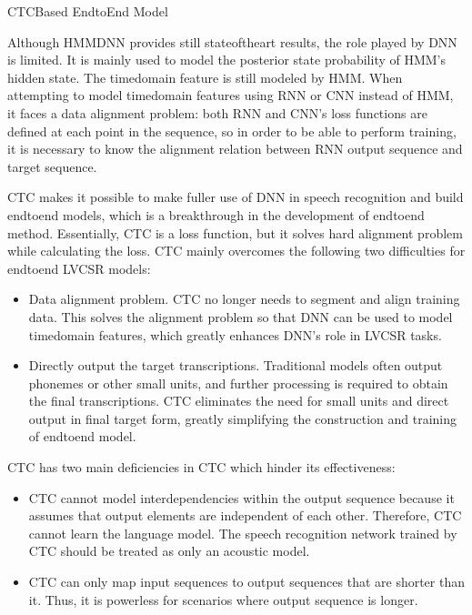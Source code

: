 \documentclass[letterpaper,10pt,english]{jupyterBook}
\begin{document}
\sphinxAtStartPar
CTC\sphinxhyphen{}Based End\sphinxhyphen{}to\sphinxhyphen{}End Model

\sphinxAtStartPar
Although HMM\sphinxhyphen{}DNN provides still state\sphinxhyphen{}of\sphinxhyphen{}the\sphinxhyphen{}art results, the role
played by DNN is limited. It is mainly used to model the posterior state
probability of HMM’s hidden state. The time\sphinxhyphen{}domain feature is still
modeled by HMM. When attempting to model time\sphinxhyphen{}domain features using RNN
or CNN instead of HMM, it faces a data alignment problem: both RNN and
CNN’s loss functions are defined at each point in the sequence, so in
order to be able to perform training, it is necessary to know the
alignment relation between RNN output sequence and target sequence.

\sphinxAtStartPar
CTC makes it possible to make fuller use of DNN in speech recognition
and build end\sphinxhyphen{}to\sphinxhyphen{}end models, which is a breakthrough in the development
of end\sphinxhyphen{}to\sphinxhyphen{}end method. Essentially, CTC is a loss function, but it solves
hard alignment problem while calculating the loss. CTC mainly overcomes
the following two difficulties for end\sphinxhyphen{}to\sphinxhyphen{}end LVCSR models:
\begin{itemize}
\item {} 
\sphinxAtStartPar
Data alignment problem. CTC no longer needs to segment and align
training data. This solves the alignment problem so that DNN can be
used to model time\sphinxhyphen{}domain features, which greatly enhances DNN’s
role in LVCSR tasks.

\item {} 
\sphinxAtStartPar
Directly output the target transcriptions. Traditional models often
output phonemes or other small units, and further processing is
required to obtain the final transcriptions. CTC eliminates the need
for small units and direct output in final target form, greatly
simplifying the construction and training of end\sphinxhyphen{}to\sphinxhyphen{}end model.

\end{itemize}

\sphinxAtStartPar
{}

\sphinxAtStartPar
CTC has two main deficiencies in CTC which hinder its effectiveness:
\begin{itemize}
\item {} 
\sphinxAtStartPar
CTC cannot model interdependencies within the output sequence
because it assumes that output elements are independent of each
other. Therefore, CTC cannot learn the language model. The speech
recognition network trained by CTC should be treated as only an
acoustic model.

\item {} 
\sphinxAtStartPar
CTC can only map input sequences to output sequences that are
shorter than it. Thus, it is powerless for scenarios where output
sequence is longer.

\end{itemize}
\end{document}
